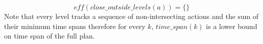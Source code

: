 \documentclass{article}
\begin{document}
$$
eff(close\_outside\_levels(a)) = \{\}
$$
Note that every level tracks a sequence of non-intersecting actions and the sum of their minimum time spans therefore for every $k$, $time\_span(k)$ is a lower bound on time span of the full plan.







 


\end{document}
